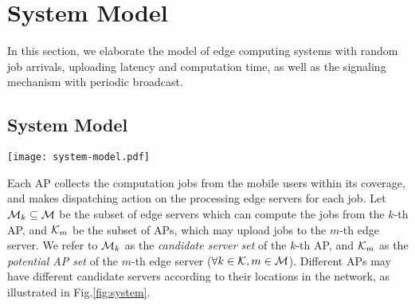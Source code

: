 \section{System Model}
\label{sec:model}
In this section, we elaborate the model of edge computing systems with random job arrivals, uploading latency and computation time,
as well as the signaling mechanism with periodic broadcast.
\subsection{System Model}
\begin{figure*}[htp!]
    \centering
    \texttt{[image: system-model.pdf]}
    \caption{ The Illustration of System Model}
    \label{fig:system}
\end{figure*}
Each AP collects the computation jobs from the mobile users within its coverage, and makes dispatching action on the processing edge servers for each job.
Let $\mathcal{M}_{k} \subseteq \mathcal{M}$ be the subset of edge servers which can compute the jobs from the $k$-th AP, and $\mathcal{K}_{m}$ be the subset of APs, which may upload jobs to the $m$-th edge server.
We refer to $\mathcal{M}_{k}$ as the \emph{candidate server set} of the $k$-th AP, and $\mathcal{K}_{m}$ as the \emph{potential AP set} of the $m$-th edge server ($\forall k\in\mathcal{K}, m\in\mathcal{M}$).
Different APs may have different candidate servers according to their locations in the network, as illustrated in Fig.\ref{fig:system}.
